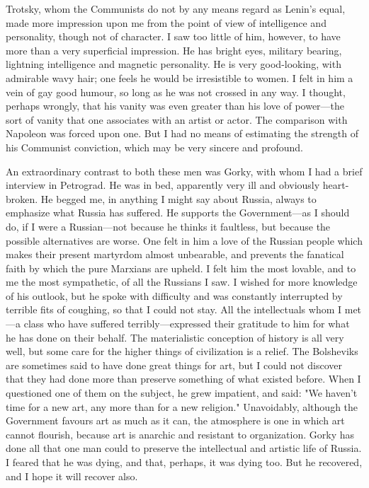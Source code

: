 Trotsky, whom the Communists do not by any means regard as Lenin's equal, made more impression upon me from the point of view of intelligence and personality, though not of character. I saw too little of him, however, to have more than a very superficial impression. He has bright eyes, military bearing, lightning intelligence and magnetic personality. He is very good-looking, with admirable wavy hair; one feels he would be irresistible to women. I felt in him a vein of gay good humour, so long as he was not crossed in any way. I thought, perhaps wrongly, that his vanity was even greater than his love of power---the sort of vanity that one associates with an artist or actor. The comparison with Napoleon was forced upon one. But I had no means of estimating the strength of his Communist conviction, which may be very sincere and profound.

An extraordinary contrast to both these men was Gorky, with whom I had a brief interview in Petrograd. He was in bed, apparently very ill and obviously heart-broken. He begged me, in anything I might say about Russia, always to emphasize what Russia has suffered. He supports the Government---as I should do, if I were a Russian---not because he thinks it faultless, but because the possible alternatives are worse. One felt in him a love of the Russian people which makes their present martyrdom almost unbearable, and prevents the fanatical faith by which the pure Marxians are upheld. I felt him the most lovable, and to me the most sympathetic, of all the Russians I saw. I wished for more knowledge of his outlook, but he spoke with difficulty and was constantly interrupted by terrible fits of coughing, so that I could not stay. All the intellectuals whom I met---a class who have suffered terribly---expressed their gratitude to him for what he has done on their behalf. The materialistic conception of history is all very well, but some care for the higher things of civilization is a relief. The Bolsheviks are sometimes said to have done great things for art, but I could not discover that they had done more than preserve something of what existed before. When I questioned one of them on the subject, he grew impatient, and said: "We haven't time for a new art, any more than for a new religion." Unavoidably, although the Government favours art as much as it can, the atmosphere is one in which art cannot flourish, because art is anarchic and resistant to organization. Gorky has done all that one man could to preserve the intellectual and artistic life of Russia. I feared that he was dying, and that, perhaps, it was dying too. But he recovered, and I hope it will recover also.